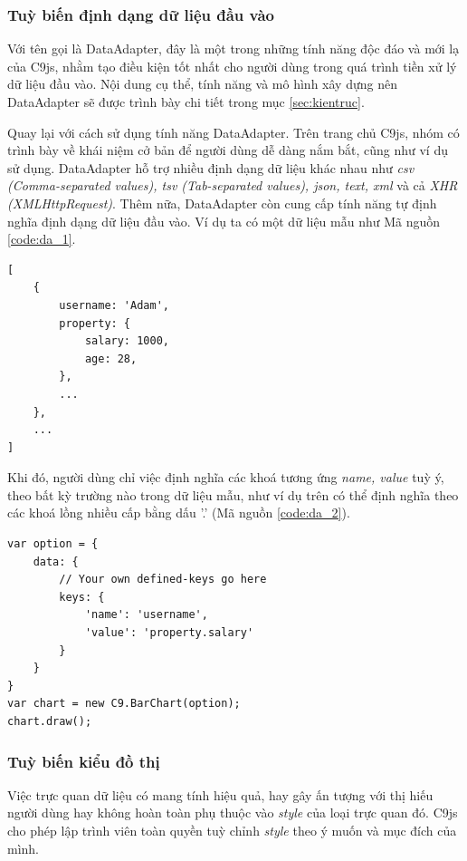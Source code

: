 \documentclass[12pt,a4paper,twoside]{article}
\begin{document}
\subsubsection{Tuỳ biến định dạng dữ liệu đầu vào}
Với tên gọi là DataAdapter, đây là một trong những tính năng độc đáo và mới lạ của C9js, nhằm tạo điều kiện tốt nhất cho người dùng trong quá trình tiền xử lý dữ liệu đầu vào. Nội dung cụ thể, tính năng và mô hình xây dựng nên DataAdapter sẽ được trình bày chi tiết trong mục \ref{sec:kientruc}.

Quay lại với cách sử dụng tính năng DataAdapter. Trên trang chủ C9js, nhóm có trình bày về khái niệm cở bản để người dùng dễ dàng nắm bắt, cũng như ví dụ sử dụng. DataAdapter hỗ trợ nhiều định dạng dữ liệu khác nhau như \textit{csv (Comma-separated values), tsv (Tab-separated values), json, text, xml} và cả \textit{XHR (XMLHttpRequest)}\cite{xhr}\cite{csv}\cite{tsv}. Thêm nữa, DataAdapter còn cung cấp tính năng tự định nghĩa định dạng dữ liệu đầu vào. Ví dụ ta có một dữ liệu mẫu như Mã nguồn \ref{code:da_1}.

\begin{lstlisting}[caption=Một dữ liệu mẫu với các thuộc tính lồng nhiều cấp, label={code:da_1}]
[
	{
		username: 'Adam',
		property: {
			salary: 1000,
			age: 28,
		},
		...
	},
	...
]
\end{lstlisting}

Khi đó, người dùng chỉ việc định nghĩa các khoá tương ứng \textit{name, value} tuỳ ý, theo bất kỳ trường nào trong dữ liệu mẫu, như ví dụ trên có thể định nghĩa theo các khoá lồng nhiều cấp bằng dấu \textsf{'.'} (Mã nguồn \ref{code:da_2}).

\begin{lstlisting}[caption=Định nghĩa định dạng dữ liệu đầu vào với C9js, label={code:da_2}]
var option = {
    data: {
        // Your own defined-keys go here
        keys: {
            'name': 'username',
            'value': 'property.salary'
        }
    }
}
var chart = new C9.BarChart(option);
chart.draw();
\end{lstlisting}

\subsubsection{Tuỳ biến kiểu đồ thị}
Việc trực quan dữ liệu có mang tính hiệu quả, hay gây ấn tượng với thị hiếu người dùng hay không hoàn toàn phụ thuộc vào \textit{style} của loại trực quan đó. C9js cho phép lập trình viên toàn quyền tuỳ chỉnh \textit{style} theo ý muốn và mục đích của mình.
\end{document}
